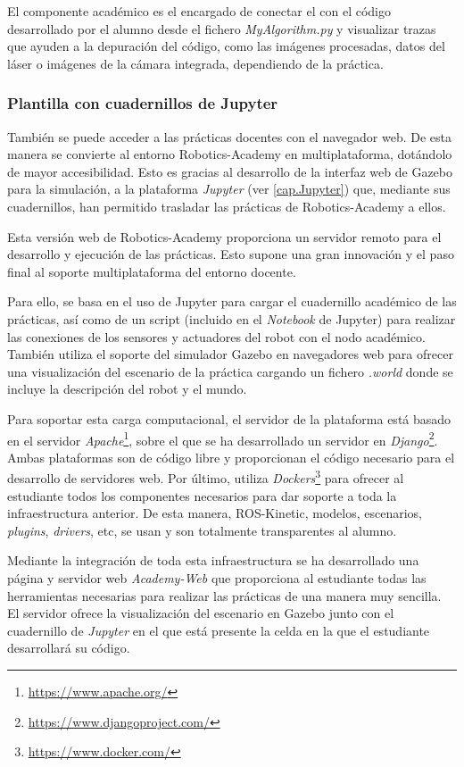  El componente académico es el encargado de conectar el  con el código desarrollado por el alumno desde el fichero \textit{MyAlgorithm.py} y visualizar trazas que ayuden a la depuración del código, como las imágenes procesadas, datos del láser o imágenes de la cámara integrada, dependiendo de la práctica.

\subsubsection{Plantilla con cuadernillos de Jupyter}
También se puede acceder a las prácticas docentes con el navegador web. De esta manera se convierte al entorno Robotics-Academy en multiplataforma, dotándolo de mayor accesibilidad. Esto es gracias al desarrollo de la interfaz web de Gazebo para la simulación, a la plataforma \textit{Jupyter} (ver \ref{cap.Jupyter}) que, mediante sus cuadernillos, han permitido trasladar las prácticas de Robotics-Academy a ellos.

Esta versión web de Robotics-Academy proporciona un servidor remoto para el desarrollo y ejecución de las prácticas. Esto supone una gran innovación y el paso final al soporte multiplataforma del entorno docente.

Para ello, se basa en el uso de Jupyter para cargar el cuadernillo académico de las prácticas, así como de un script (incluido en el \textit{Notebook} de Jupyter) para realizar las conexiones de los sensores y actuadores del robot con el nodo académico. También utiliza el soporte del simulador Gazebo en navegadores web para ofrecer una visualización del escenario de la práctica cargando un fichero \textit{.world} donde se incluye la descripción del robot y el mundo. 

Para soportar esta carga computacional, el servidor de la plataforma está basado en el servidor \textit{Apache}\footnote{\url{https://www.apache.org/}}, sobre el que se ha desarrollado un servidor en \textit{Django}\footnote{\url{https://www.djangoproject.com/}}. Ambas plataformas son de código libre y proporcionan el código necesario para el desarrollo de servidores web. Por último, utiliza \textit{Dockers}\footnote{\url{https://www.docker.com/}} para ofrecer al estudiante todos los componentes necesarios para dar soporte a toda la infraestructura anterior. De esta manera, ROS-Kinetic, modelos, escenarios, \textit{plugins}, \textit{drivers}, etc, se usan y son totalmente transparentes al alumno.

Mediante la integración de toda esta infraestructura se ha desarrollado  una página y servidor web \textit{Academy-Web} que proporciona al estudiante todas las herramientas necesarias para realizar las prácticas de una manera muy sencilla. El servidor ofrece la visualización del escenario en Gazebo junto con el cuadernillo de \textit{Jupyter} en el que está presente la celda en la que el estudiante desarrollará su código.

